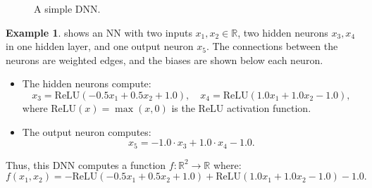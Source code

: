 \documentclass[oneside,11pt,dvipsnames]{book}
\numberwithin{equation}{section}
\theoremstyle{definition}
\newtheorem{example}{Example}[section]
\theoremstyle{remark}
\newcommand{\relu}[1]{\mathrm{ReLU}\left(#1\right)}
\begin{document}
\begin{figure}
    \centering
    \caption{\label{fig:dnn}A simple DNN.}
\end{figure}

\begin{example}\label{ex:dnn}
 shows an NN with two inputs $x_1, x_2 \in \mathbb{R}$, two hidden neurons \(x_3, x_4\) in one hidden layer, and one output neuron \(x_5\). The connections between the neurons are weighted edges, and the biases are shown below each neuron.


\begin{itemize}
    \item The hidden neurons compute:
    \[
    x_3 = \relu{-0.5 x_1 + 0.5 x_2 + 1.0},\quad x_4 = \relu{1.0 x_1 + 1.0 x_2 - 1.0},
    \]
    where $\relu{x} = \max(x, 0)$ is the ReLU activation function.
    \item The output neuron computes:
    \[
    x_5 = -1.0 \cdot x_3 + 1.0 \cdot x_4 - 1.0.
    \]
\end{itemize}

Thus, this DNN computes a function \(f: \mathbb{R}^2 \to \mathbb{R}\) where:
\[
f(x_1, x_2) = -\relu{-0.5 x_1 + 0.5 x_2 + 1.0} + \relu{1.0 x_1 + 1.0 x_2 - 1.0} - 1.0.
\]
\end{example}
\end{document}
